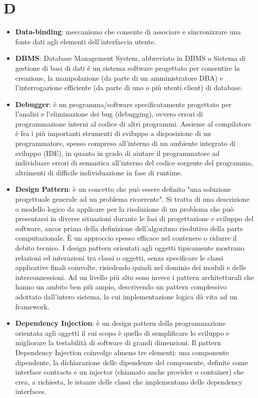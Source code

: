 \section{D}
\begin{itemize}
	\item
	\textbf{Data-binding}: meccanismo che consente di associare e sincronizzare una fonte dati agli elementi dell’interfaccia utente.
	\item
	\textbf{DBMS}: Database Management System, abbreviato in DBMS o Sistema di gestione di basi di dati è un sistema software progettato per consentire la creazione, la manipolazione (da parte di un amministratore DBA) e l'interrogazione efficiente (da parte di uno o più utenti client) di database.
	\item
	\textbf{Debugger}: è un programma/software specificatamente progettato per l'analisi e l'eliminazione dei bug (debugging), ovvero errori di programmazione interni al codice di altri programmi. Assieme al compilatore è fra i più importanti strumenti di sviluppo a disposizione di un programmatore, spesso compreso all'interno di un ambiente integrato di sviluppo (IDE), in quanto in grado di aiutare il programmatore ad individuare errori di semantica all'interno del codice sorgente del programma, altrimenti di difficile individuazione in fase di runtime.
	\item
	\textbf{Design Pattern}: è un concetto che può essere definito "una soluzione progettuale generale ad un problema ricorrente". Si tratta di una descrizione o modello logico da applicare per la risoluzione di un problema che può presentarsi in diverse situazioni durante le fasi di progettazione e sviluppo del software, ancor prima della definizione dell'algoritmo risolutivo della parte computazionale. È un approccio spesso efficace nel contenere o ridurre il debito tecnico.
	I design pattern orientati agli oggetti tipicamente mostrano relazioni ed interazioni tra classi o oggetti, senza specificare le classi applicative finali coinvolte, risiedendo quindi nel dominio dei moduli e delle interconnessioni. Ad un livello più alto sono invece i pattern architetturali che hanno un ambito ben più ampio, descrivendo un pattern complessivo adottato dall'intero sistema, la cui implementazione logica dà vita ad un framework.
	\item
	\textbf{Dependency Injection}: è un design pattern della programmazione orientata agli oggetti il cui scopo è quello di semplificare lo sviluppo e migliorare la testabilità di software di grandi dimensioni. Il pattern Dependency Injection coinvolge almeno tre elementi: una componente dipendente, la dichiarazione delle dipendenze del componente, definite come interface contracts e un injector (chiamato anche provider o container) che crea, a richiesta, le istanze delle classi che implementano delle dependency interfaces.

\end{itemize}
